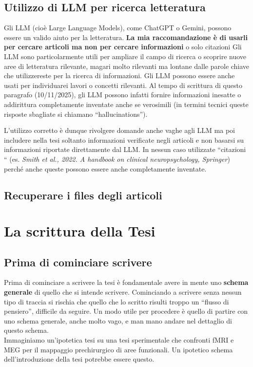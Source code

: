 \documentclass[12pt]{book}
\newcommand{\oq}{``} %
\newcommand{\cq}{''} %
\begin{document}
\section{Utilizzo di LLM per ricerca letteratura}
Gli LLM (cioè Large Language Models), come ChatGPT o Gemini, possono essere un valido aiuto per la letteratura.  \textbf{La mia raccomandazione è di usarli per cercare articoli ma non per cercare informazioni} o solo citazioni
Gli LLM sono particolarmente utili per ampliare il campo di ricerca o scoprire nuove aree di letteratura rilevante, magari molto rilevanti ma lontane dalle parole chiave che utilizzereste per la ricerca di informazioni.  Gli LLM possono essere anche usati per individuarei lavori o concetti rilevanti.
Al tempo di scrittura di questo paragrafo (10/11/2025), gli LLM possono infatti fornire informazioni inesatte o addirittura completamente inventate anche se verosimili (in termini tecnici queste risposte sbagliate si chiamano ``hallucinations'').

L'utilizzo corretto è dunque rivolgere domande anche vaghe agli LLM ma poi includere nella tesi soltanto informazioni verificate negli articoli e non basarsi su informazioni riportate direttamente dal LLM.
In nessun caso utilizzate ``citazioni `` (es. \emph{Smith et al., 2022. A handbook on clinical neuropsychology, Springer}) perché anche queste possono essere anche completamente inventate.




\section{Recuperare i files degli articoli}


\chapter{La scrittura della Tesi}
\section{Prima di cominciare scrivere}
Prima di cominciare a scrivere la tesi è fondamentale avere in mente uno \textbf{schema generale} di quello che si intende scrivere. Cominciando a scrivere senza nessun tipo di traccia si rischia che quello che lo scritto risulti troppo un \oq flusso di pensiero\cq, difficile da seguire. Un modo utile per procedere è quello di partire con uno schema generale, anche molto vago, e man mano andare nel dettaglio di questo schema. \\
Immaginiamo un'ipotetica tesi su una tesi sperimentale che confronti \mbox{fMRI} e MEG per il mappaggio prechirurgico di aree funzionali. Un ipotetico schema dell'introduzione della tesi potrebbe essere questo.
\end{document}
